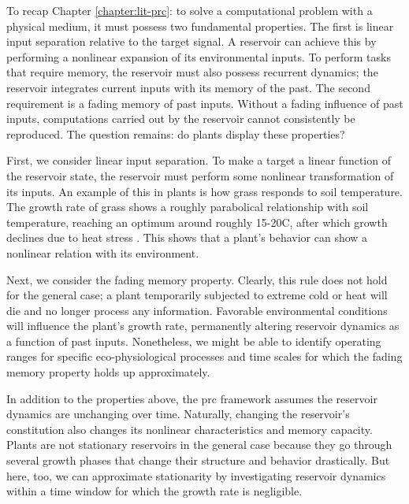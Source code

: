 
To recap Chapter \ref{chapter:lit-prc}: to solve a computational problem with a physical medium, it must possess two fundamental properties.
The first is linear input separation relative to the target signal.
A reservoir can achieve this by performing a nonlinear expansion of its environmental inputs.
To perform tasks that require memory, the reservoir must also possess recurrent dynamics; 
the reservoir integrates current inputs with its memory of the past.
The second requirement is a fading memory of past inputs.
Without a fading influence of past inputs, computations carried out by the reservoir cannot consistently be reproduced.
The question remains: do plants display these properties?


First, we consider linear input separation.
To make a target a linear function of the reservoir state, the reservoir must perform some nonlinear transformation of its inputs.
An example of this in plants is how grass responds to soil temperature. 
The growth rate of grass shows a roughly parabolical relationship with soil temperature, reaching an optimum around roughly 15-20\degree C, after which growth declines due to heat stress \citep{hurtado-uria_relationships_2013}.
This shows that a plant's behavior can show a nonlinear relation with its environment.


Next, we consider the fading memory property.
Clearly, this rule does not hold for the general case; a plant temporarily subjected to extreme cold or heat will die and no longer process any information.
Favorable environmental conditions will influence the plant's growth rate, permanently altering reservoir dynamics as a function of past inputs.
Nonetheless, we might be able to identify operating ranges for specific eco-physiological processes and time scales for which the fading memory property holds up approximately.


In addition to the properties above, the \acrshort{prc} framework assumes the reservoir dynamics are unchanging over time.
Naturally, changing the reservoir's constitution also changes its nonlinear characteristics and memory capacity.
Plants are not stationary reservoirs in the general case because they go through several growth phases that change their structure and behavior drastically.
But here, too, we can approximate stationarity by investigating reservoir dynamics within a time window for which the growth rate is negligible.


